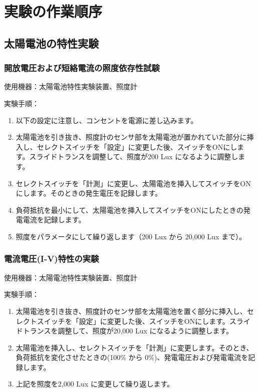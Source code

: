 \documentclass[a4paper,11pt,xelatex,ja=standard]{bxjsarticle}
\begin{document}
\section{実験の作業順序}
    \subsection{太陽電池の特性実験}
        \subsubsection{開放電圧および短絡電流の照度依存性試験}
            使用機器：太陽電池特性実験装置、照度計

            実験手順：
            \begin{enumerate}
                \item 以下の設定に注意し、コンセントを電源に差し込みます。
                \item 太陽電池を引き抜き、照度計のセンサ部を太陽電池が置かれていた部分に挿入し、セレクトスイッチを「設定」に変更した後、スイッチをONにします。スライドトランスを調整して、照度が200 Lux になるように調整します。
                \item セレクトスイッチを「計測」に変更し、太陽電池を挿入してスイッチをONにします。そのときの発生電圧を記録します。
                \item 負荷抵抗を最小にして、太陽電池を挿入してスイッチをONにしたときの発電電流を記録します。
                \item 照度をパラメータにして繰り返します（200 Lux から 20,000 Lux まで）。
            \end{enumerate}

        \subsubsection{電流電圧(I-V)特性の実験}
            使用機器：太陽電池特性実験装置、照度計

            実験手順：
            \begin{enumerate}
                \item 太陽電池を引き抜き、照度計のセンサ部を太陽電池を置く部分に挿入し、セレクトスイッチを「設定」に変更した後、スイッチをONにします。スライドトランスを調整して、照度が20,000 Lux になるように調整します。
                \item 太陽電池を挿入し、セレクトスイッチを「計測」に変更します。そのとき、負荷抵抗を変化させたときの(100\% から 0\%)、発電電圧および発電電流を記録します。
                \item 上記を照度を2,000 Lux に変更して繰り返します。
            \end{enumerate}
\end{document}
